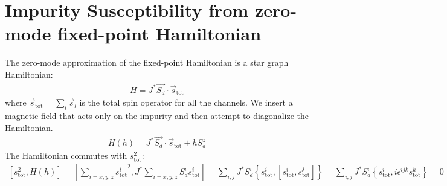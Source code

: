 \documentclass{revtex4-2}
\numberwithin{equation}{section}
\begin{document}
\section{Impurity Susceptibility from zero-mode fixed-point Hamiltonian}
The zero-mode approximation of the fixed-point Hamiltonian is a star graph Hamiltonian:
\begin{equation}\begin{aligned}
	H = J^* \vec{S_d}\cdot\vec{s}_\text{tot}
\end{aligned}\end{equation}
where \(\vec s_\text{tot} = \sum_l \vec s_l\) is the total spin operator for all the channels. We insert a magnetic field that acts only on the impurity and then attempt to diagonalize the Hamiltonian.
\begin{equation}\begin{aligned}
	\label{stargraph_field_hamiltonian}
	H(h) = J^* \vec{S_d}\cdot\vec{s}_\text{tot} + h S_d^z
\end{aligned}\end{equation}
The Hamiltonian commutes with \(s_\text{tot}^2\):
\begin{equation}\begin{aligned}
\left[s_\text{tot}^2, H(h)\right] = \left[\sum_{i=x,y,z}{s^i_\text{tot}}^2, J^* \sum_{i=x,y,z} S_d^i s^i_\text{tot}\right] = \sum_{i,j}J^* S_d^i \left\{s_\text{tot}^i, \left[s_\text{tot}^i,s_\text{tot}^j\right]\right\} = \sum_{i,j}J^* S_d^i \left\{s_\text{tot}^i, i \epsilon^{ijk}s^k_\text{tot}\right\} = 0
\end{aligned}\end{equation}
\end{document}
